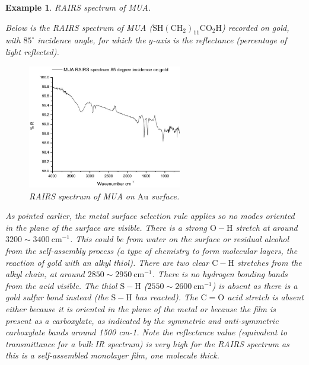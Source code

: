 \documentclass{article}
\theoremstyle{plain}\theoremheaderfont{\normalfont\itshape}\theorembodyfont{\rmfamily}\theoremseparator{.}\newtheorem*{rem}{Remark}\newtheorem*{ex}{Example}\newtheorem*{proof}{Proof}\newtheorem*{altp}{Alternative proof}
\theoremstyle{plain}\theoremheaderfont{\normalfont\bfseries}\theorembodyfont{\rmfamily}\theoremseparator{.}\newtheorem{thm}{Theorem}[section]\newtheorem{lem}[thm]{Lemma}\newtheorem{prop}[thm]{Proposition}\newtheorem*{cor}{Corollary}\newtheorem{defn}[thm]{Definition}\newtheorem{clm}[thm]{Claim}\newtheorem{clminproof}{Claim}\newtheorem*{law}{Law}\newtheorem{pos}[thm]{Postulate}
\theoremstyle{break}\theoremheaderfont{\normalfont\itshape}\theorembodyfont{\rmfamily}\theoremseparator{.\medskip}\newtheorem*{proofskip}{Proof}\newtheorem*{exs}{Examples}\newtheorem*{rems}{Remarks}
\theoremstyle{break}\theoremheaderfont{\normalfont\bfseries}\theorembodyfont{\rmfamily}\theoremseparator{.\medskip}\newtheorem{lemskip}[thm]{Lemma}\newtheorem{defnskip}[thm]{Definition}\newtheorem{propskip}[thm]{Proposition}\newtheorem{thmskip}[thm]{Theorem}
\numberwithin{equation}{section}
\newcommand{\unit}[1]{\ \mathrm{#1}}
\begin{document}
	\begin{ex}
		\textit{RAIRS spectrum of MUA.}

		Below is the RAIRS spectrum of MUA (\(\mathrm{SH(CH_2)_{11}CO_2H}\)) recorded on gold, with \(85^\circ\) incidence angle, for which the \(y\)-axis is the reflectance (percentage of light reflected).
		\begin{figure}[ht!]
			\centering
			\includegraphics[width=0.6\textwidth]{RAIRS_MUA_Au.jpg}
			\caption{RAIRS spectrum of MUA on \(\mathrm{Au}\) surface.}
		\end{figure}

		As pointed earlier, the metal surface selection rule applies so no modes oriented in the plane of the surface are visible. There is a strong \(\mathrm{O-H}\) stretch at around \(3200\sim 3400\unit{cm}^{-1}\). This could be from water on the surface or residual alcohol from the self-assembly process (a type of chemistry to form molecular layers, the reaction of gold with an alkyl thiol). There are two clear \(\mathrm{C-H}\) stretches from the alkyl chain, at around \(2850\sim 2950\unit{cm}^{-1}\). There is no hydrogen bonding bands from the acid visible. The thiol \(\mathrm{S-H}\) (\(2550\sim 2600\unit{cm}^{-1}\)) is absent as there is a gold sulfur bond instead (the \(\mathrm{S-H}\) has reacted). The \(\mathrm{C=O}\) acid stretch is absent either because it is oriented in the plane of the metal or because the film is present as a carboxylate, as indicated by the symmetric and anti-symmetric carboxylate bands around 1500 cm-1. Note the reflectance value (equivalent to transmittance for a bulk IR spectrum) is very high for the RAIRS spectrum as this is a self-assembled monolayer film, one molecule thick.
	\end{ex}
\end{document}
